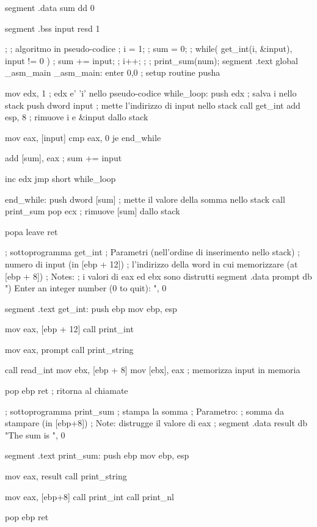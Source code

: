 \begin{AsmCodeListing}[label=sub3.asm]

segment .data
sum     dd   0

segment .bss
input   resd 1

;
; algoritmo in pseudo-codice
; i = 1;
; sum = 0;
; while( get_int(i, &input), input != 0 ) {
;   sum += input;
;   i++;
; }
; print_sum(num);
segment .text
        global  _asm_main
_asm_main:
        enter   0,0               ; setup routine
        pusha

        mov     edx, 1            ; edx e' 'i' nello pseudo-codice
while_loop:
        push    edx               ; salva i nello stack
        push    dword input       ; mette l'indirizzo di input nello stack
        call    get_int
        add     esp, 8            ; rimuove i e &input dallo stack

        mov     eax, [input]
        cmp     eax, 0
        je      end_while

        add     [sum], eax        ; sum += input

        inc     edx
        jmp     short while_loop

end_while:
        push    dword [sum]       ; mette il valore della somma nello stack
        call    print_sum
        pop     ecx               ; rimuove [sum] dallo stack

        popa
        leave                     
        ret

; sottoprogramma get_int
; Parametri (nell'ordine di inserimento nello stack)
;   numero di input (in [ebp + 12])
;   l'indirizzo della word in cui memorizzare (at [ebp + 8])
; Notes:
;   i valori di eax ed ebx sono distrutti
segment .data
prompt  db      ") Enter an integer number (0 to quit): ", 0

segment .text
get_int:
        push    ebp
        mov     ebp, esp

        mov     eax, [ebp + 12]
        call    print_int

        mov     eax, prompt
        call    print_string
        
        call    read_int
        mov     ebx, [ebp + 8]
        mov     [ebx], eax         ; memorizza input in memoria

        pop     ebp
        ret                        ; ritorna al chiamate

; sottoprogramma print_sum
; stampa la somma
; Parametro:
;   somma da stampare (in [ebp+8])
; Note: distrugge il valore di eax
;
segment .data
result  db      "The sum is ", 0

segment .text
print_sum:
        push    ebp
        mov     ebp, esp

        mov     eax, result
        call    print_string

        mov     eax, [ebp+8]
        call    print_int
        call    print_nl

        pop     ebp
        ret
\end{AsmCodeListing}


